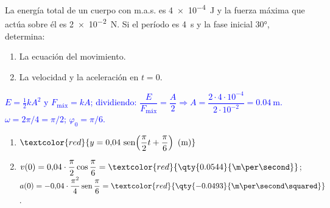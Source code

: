 \begin{exercise}
    La energía total de un cuerpo con m.a.s. es \qty{4e-4}{\joule} y la fuerza máxima que actúa sobre él es
    \qty{2e-2}{\newton}. Si el período es \qty{4}{\second} y la fase inicial \ang{30}, determina:
    \begin{enumerate}[label=\letraminuscula]
        \item La ecuación del movimiento.
        \item La velocidad y la aceleración en \(t = 0\).
    \end{enumerate}
    \begin{solu}
        \textcolor{blue}{\(E = \frac{1}{2}kA^2\) y \(F_{\text{máx}} = kA\); dividiendo: \(\dfrac{E}{F_{\text{máx}}} = \dfrac{A}{2}
        \Rightarrow A = \dfrac{2\cdot 4\cdot 10^{-4}}{2\cdot 10^{-2}} = \qty{0.04}{\m}\). \(\omega = 2\pi/4 = \pi/2\); \(\varphi_0 = \pi/6\).}
        \begin{enumerate}[label=\letraminuscula]
            \item \(\textcolor{red}{y = 0{,}04\,\sen\!\left(\dfrac{\pi}{2}t + \dfrac{\pi}{6}\right)\ \text{(m)}}\)
            \item \(v(0) = 0{,}04\cdot\dfrac{\pi}{2}\cos\dfrac{\pi}{6} = \textcolor{red}{\qty{0.0544}{\m\per\second}}\);
            \(a(0) = -0{,}04\cdot\dfrac{\pi^2}{4}\sen\dfrac{\pi}{6} = \textcolor{red}{\qty{-0.0493}{\m\per\second\squared}}\).
        \end{enumerate}
    \end{solu}
\end{exercise}

